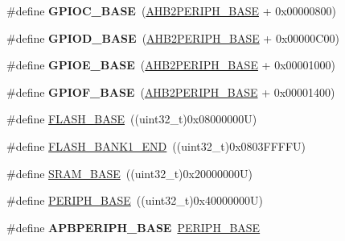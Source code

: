 \begin{DoxyCompactItemize}
\#define {\bfseries G\+P\+I\+O\+C\+\_\+\+B\+A\+SE}~(\hyperlink{group___peripheral__memory__map_gaeedaa71d22a1948492365e2cd26cfd46}{A\+H\+B2\+P\+E\+R\+I\+P\+H\+\_\+\+B\+A\+SE} + 0x00000800)
\item 
\mbox{\label{group___peripheral__memory__map_ga1a93ab27129f04064089616910c296ec}} 
\#define {\bfseries G\+P\+I\+O\+D\+\_\+\+B\+A\+SE}~(\hyperlink{group___peripheral__memory__map_gaeedaa71d22a1948492365e2cd26cfd46}{A\+H\+B2\+P\+E\+R\+I\+P\+H\+\_\+\+B\+A\+SE} + 0x00000\+C00)
\item 
\mbox{\label{group___peripheral__memory__map_gab487b1983d936c4fee3e9e88b95aad9d}} 
\#define {\bfseries G\+P\+I\+O\+E\+\_\+\+B\+A\+SE}~(\hyperlink{group___peripheral__memory__map_gaeedaa71d22a1948492365e2cd26cfd46}{A\+H\+B2\+P\+E\+R\+I\+P\+H\+\_\+\+B\+A\+SE} + 0x00001000)
\item 
\mbox{\label{group___peripheral__memory__map_ga7f9a3f4223a1a784af464a114978d26e}} 
\#define {\bfseries G\+P\+I\+O\+F\+\_\+\+B\+A\+SE}~(\hyperlink{group___peripheral__memory__map_gaeedaa71d22a1948492365e2cd26cfd46}{A\+H\+B2\+P\+E\+R\+I\+P\+H\+\_\+\+B\+A\+SE} + 0x00001400)
\item 
\#define \hyperlink{group___peripheral__memory__map_ga23a9099a5f8fc9c6e253c0eecb2be8db}{F\+L\+A\+S\+H\+\_\+\+B\+A\+SE}~((uint32\+\_\+t)0x08000000\+U)
\item 
\#define \hyperlink{group___peripheral__memory__map_ga443a2786535d83e32dfdc2b29e379332}{F\+L\+A\+S\+H\+\_\+\+B\+A\+N\+K1\+\_\+\+E\+ND}~((uint32\+\_\+t)0x0803\+F\+F\+F\+F\+U)
\item 
\#define \hyperlink{group___peripheral__memory__map_ga05e8f3d2e5868754a7cd88614955aecc}{S\+R\+A\+M\+\_\+\+B\+A\+SE}~((uint32\+\_\+t)0x20000000\+U)
\item 
\#define \hyperlink{group___peripheral__memory__map_ga9171f49478fa86d932f89e78e73b88b0}{P\+E\+R\+I\+P\+H\+\_\+\+B\+A\+SE}~((uint32\+\_\+t)0x40000000\+U)
\item 
\mbox{\label{group___peripheral__memory__map_gac85f31889eb6a3f651b563bbc7131f91}} 
\#define {\bfseries A\+P\+B\+P\+E\+R\+I\+P\+H\+\_\+\+B\+A\+SE}~\hyperlink{group___peripheral__memory__map_ga9171f49478fa86d932f89e78e73b88b0}{P\+E\+R\+I\+P\+H\+\_\+\+B\+A\+SE}
\item 

\end{DoxyCompactItemize}
